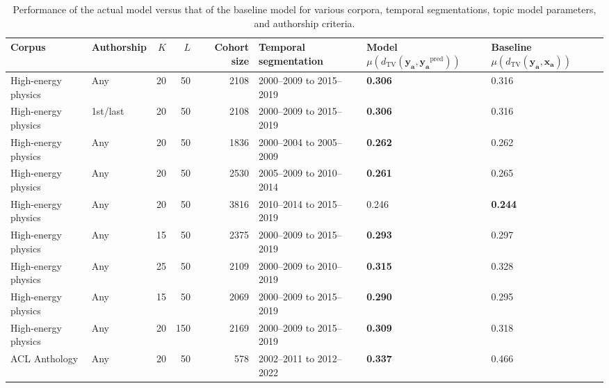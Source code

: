 \begin{table}
\caption{Performance of the actual model versus that of the baseline model for various corpora, temporal segmentations, topic model parameters, and authorship criteria.}
\label{table:performance}
\begin{tabular}{llrrrlll}
\toprule
Corpus & Authorship & $K$ & $L$ & Cohort size & Temporal segmentation & Model\newline $\mu(d_{{\mathrm{{TV}}}}(\bm{{y_{{a}}}}, \bm{{y_{{a}}}}^{{\text{{pred}}}}))$ & Baseline\newline $\mu(d_{{\mathrm{{TV}}}}(\bm{{y_{{a}}}}, \bm{{x_{{a}}}}))$ \\
\midrule
High-energy physics & Any & 20 & 50 & 2108 & 2000--2009 to 2015--2019 & \textbf{0.306} & 0.316 \\
High-energy physics & 1st/last & 20 & 50 & 2108 & 2000--2009 to 2015--2019 & \textbf{0.306} & 0.316 \\
High-energy physics & Any & 20 & 50 & 1836 & 2000--2004 to 2005--2009 & \textbf{0.262} & 0.262 \\
High-energy physics & Any & 20 & 50 & 2530 & 2005--2009 to 2010--2014 & \textbf{0.261} & 0.265 \\
High-energy physics & Any & 20 & 50 & 3816 & 2010--2014 to 2015--2019 & 0.246 & \textbf{0.244} \\
High-energy physics & Any & 15 & 50 & 2375 & 2000--2009 to 2015--2019 & \textbf{0.293} & 0.297 \\
High-energy physics & Any & 25 & 50 & 2109 & 2000--2009 to 2010--2019 & \textbf{0.315} & 0.328 \\
High-energy physics & Any & 15 & 50 & 2069 & 2000--2009 to 2015--2019 & \textbf{0.290} & 0.295 \\
High-energy physics & Any & 20 & 150 & 2169 & 2000--2009 to 2015--2019 & \textbf{0.309} & 0.318 \\
ACL Anthology & Any & 20 & 50 & 578 & 2002--2011 to 2012--2022 & \textbf{0.337} & 0.466 \\
\bottomrule
\end{tabular}
\end{table}
